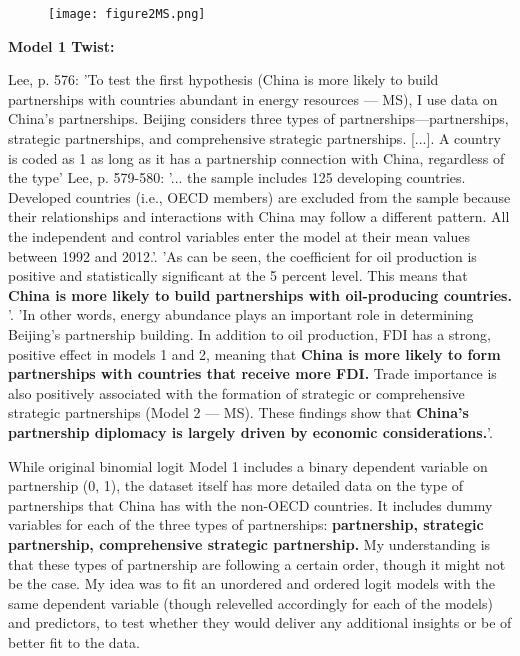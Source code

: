 \documentclass[12pt,letterpaper]{article}
\begin{document}
  


\begin{figure}[H]
    \centering
    \texttt{[image: figure2MS.png]}
\end{figure}

\newpage
\textbf{Model 1 Twist:}

Lee, p. 576: 'To test the first hypothesis (China is more likely to build partnerships with countries abundant in energy resources — MS), I use data on China’s partnerships. Beijing considers three types of partnerships—partnerships, strategic partnerships, and comprehensive strategic partnerships. [...]. A country is coded as 1 as long as it has a partnership connection with China, regardless of the type'
Lee, p. 579-580: '... the sample includes 125 developing countries. Developed countries (i.e., OECD members) are excluded from the sample because their relationships and interactions with China may follow a different pattern. All the independent and control variables enter the model at their mean values between 1992 and 2012.'. 'As can be seen, the coefficient for oil production is positive and statistically significant at the 5 percent level. This means that \textbf{China is more likely to build partnerships with oil-producing countries. }'. 'In other words, energy abundance plays an important role in determining Beijing’s partnership building. In addition to oil production, FDI has a strong, positive effect in models 1 and 2, meaning that \textbf{China is more likely to form partnerships with countries that receive more FDI.} Trade importance is also positively associated with the formation of strategic or comprehensive strategic partnerships (Model 2 — MS). These findings show that \textbf{China’s partnership diplomacy is largely driven by economic considerations.}'.

While original binomial logit Model 1 includes a binary dependent variable on partnership (0, 1), the dataset itself has more detailed data on the type of partnerships that China has with the non-OECD countries. It includes dummy variables for each of the three types of partnerships: \textbf{partnership, strategic partnership, comprehensive strategic partnership.} My understanding is that these types of partnership are following a certain order, though it might not be the case. My idea was to fit an unordered and ordered logit models with the same dependent variable (though relevelled accordingly for each of the models) and predictors, to test whether they would deliver any additional insights or be of better fit to the data. 
\end{document}
